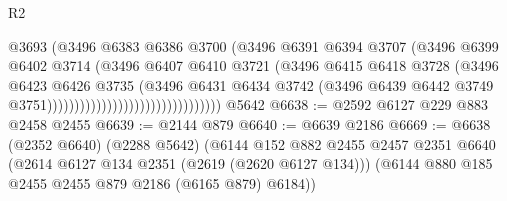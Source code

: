 \begin{lexlean}{R2}
\begin{coremodule}
                                                    @3693
                                                    (@3496
                                                      @6383
                                                      @6386
                                                      @3700
                                                      (@3496
                                                        @6391
                                                        @6394
                                                        @3707
                                                        (@3496
                                                          @6399
                                                          @6402
                                                          @3714
                                                          (@3496
                                                            @6407
                                                            @6410
                                                            @3721
                                                            (@3496
                                                              @6415
                                                              @6418
                                                              @3728
                                                              (@3496
                                                                @6423
                                                                @6426
                                                                @3735
                                                                (@3496
                                                                  @6431
                                                                  @6434
                                                                  @3742
                                                                  (@3496
                                                                    @6439
                                                                    @6442
                                                                    @3749
                                                                    @3751))))))))))))))))))))))))))))))))
    @5642
@6638 := @2592 @6127 @229 @883 @2458 @2455
@6639 := @2144 @879
@6640 := @6639 @2186
@6669 := @6638
    (@2352 @6640)
    (@2288 @5642)
    (@6144
      @152
      @882
      @2455
      @2457
      @2351
      @6640
      (@2614 @6127 @134 @2351 (@2619 (@2620 @6127 @134)))
      (@6144 @880 @185 @2455 @2455 @879 @2186 (@6165 @879) @6184))

\end{coremodule}
\end{lexlean}

